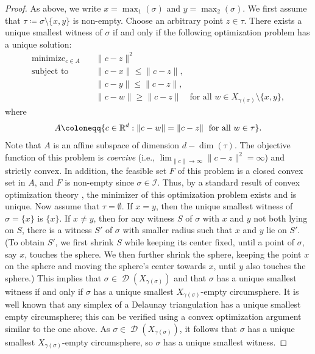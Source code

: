 \documentclass[11pt]{amsart}
\newcommand{\R}{\mathbb{R}} %
\DeclareMathOperator{\Del}{\mathcal{D}}
\DeclareMathOperator*{\minimize}{minimize}
\newcommand{\Incr}[0]{\mathcal{I}}
\theoremstyle{plain}
\theoremstyle{definition}
\theoremstyle{remark}
\begin{document}
\begin{proof}
As above, we write $x=\max_1(\sigma)$ and $y=\max_2(\sigma)$.  We first assume that $\tau \coloneqq \sigma \setminus \{x, y\}$ is non-empty.  Choose an arbitrary point $z\in \tau$.  There exists a unique smallest witness of $\sigma$ if and only if the following optimization problem has a unique solution:
\begin{equation}\label{eq:opt_Prob}
\begin{aligned}
\minimize_{c \in A} \quad & \|c - z\|^2 \\
\text{subject to} \quad & \|c - x\| \leq \|c - z\|, \\
& \|c - y\| \leq \|c - z\|, \\
& \|c - w\| \geq \|c - z\| \quad \text{for all } w \in X_{\gamma(\sigma)} \setminus \{x, y\},
\end{aligned}
\end{equation}
where \[A \coloneqq \{c\in \R^d : \|c-w\| = \|c-z\| \; \textup{ for all } w\in \tau\}.\]  Note that $A$ is an affine subspace 
of dimension $d-\dim(\tau)$.  The objective function of this problem is \emph{coercive} (i.e., $\lim_{\|c\|\to \infty}  \|c - z\|^2=\infty$) and strictly convex.  In addition, the feasible set ${F}$ of this problem is a closed convex set %
in $A$, and ${F}$ is non-empty since $\sigma \in \Incr$.  Thus, by a standard result of convex optimization theory \cite[Section 3.1]{bertsekas2009convex}, the minimizer of this optimization problem exists and is unique.
%
Now assume that  $\tau = \emptyset$.  If $x = y$, then the unique smallest witness of $\sigma=\{x\}$ is $\{x\}$.  If $x\ne y$, then for any witness $S$ of $\sigma$ with $x$ and $y$ not both lying on $S$, there is a witness $S'$ of $\sigma$ with smaller radius such that $x$ and $y$ lie on $S'$.  (To obtain $S'$, we first shrink $S$ while keeping its center fixed, until a point of $\sigma$, say $x$, touches the sphere.  We then further shrink the sphere, keeping the point $x$ on the sphere and moving the sphere's center towards $x$, until $y$ also touches the sphere.)  This implies that $\sigma\in \Del(X_{\gamma(\sigma)})$ and that  $\sigma$ has a unique smallest witness if and only if $\sigma$ has a unique smallest $X_{\gamma(\sigma)}$-empty circumsphere.  It is well known that any simplex of a Delaunay triangulation has a unique smallest empty circumsphere; this can be verified using a convex optimization argument similar to the one above.  As  $\sigma\in \Del(X_{\gamma(\sigma)})$, it follows that $\sigma$ has a unique smallest $X_{\gamma(\sigma)}$-empty circumsphere, so $\sigma$ has a unique smallest witness.
\end{proof}
\end{document}
